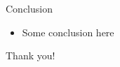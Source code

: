 \documentclass{beamer}
\begin{document}
\begin{frame}{Conclusion}
  \begin{itemize}
    \item{\color{red} Some conclusion here}
  \end{itemize}
  \vspace{1cm}
  \begin{center}
    {\huge Thank you!}
  \end{center}
\end{frame}
\end{document}
